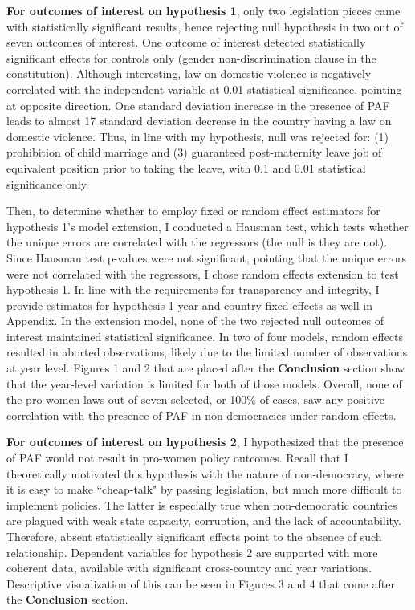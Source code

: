 \documentclass[12pt]{article}
\begin{document}
\textbf{For outcomes of interest on hypothesis 1}, only two legislation pieces came with statistically significant results, hence rejecting null hypothesis in two out of seven outcomes of interest. One outcome of interest detected statistically significant effects for controls only (gender non-discrimination clause in the constitution). Although interesting, law on domestic violence is negatively correlated with the independent variable at 0.01 statistical significance, pointing at opposite direction. One standard deviation increase in the presence of PAF leads to almost 17 standard deviation decrease in the country having a law on domestic violence. Thus, in line with my hypothesis, null was rejected for: (1) prohibition of child marriage and (3) guaranteed post-maternity leave job of equivalent position prior to taking the leave, with 0.1 and 0.01 statistical significance only. 

Then, to determine whether to employ fixed or random effect estimators for hypothesis 1's model extension, I conducted a Hausman test, which tests whether the unique errors are correlated with the regressors (the null is they are not). Since Hausman test p-values were not significant, pointing that the unique errors were not correlated with the regressors, I chose random effects extension to test hypothesis 1. In line with the requirements for transparency and integrity, I provide estimates for hypothesis 1 year and country fixed-effects as well in Appendix. In the extension model, none of the two rejected null outcomes of interest maintained statistical significance. In two of four models, random effects resulted in aborted observations, likely due to the limited number of observations at year level. Figures 1 and 2 that are placed after the \textbf{Conclusion} section show that the year-level variation is limited for both of those models. Overall, none of the pro-women laws out of seven selected, or 100\% of cases, saw any positive correlation with the presence of PAF in non-democracies under random effects. 

\textbf{For outcomes of interest on hypothesis 2}, I hypothesized that the presence of PAF would not result in pro-women policy outcomes. Recall that I theoretically motivated this hypothesis with the nature of non-democracy, where it is easy to make ``cheap-talk" by passing legislation, but much more difficult to implement policies. The latter is especially true when non-democratic countries are plagued with weak state capacity, corruption, and the lack of accountability. Therefore, absent statistically significant effects point to the absence of such relationship. Dependent variables for hypothesis 2 are supported with more coherent data, available with significant cross-country and year variations. Descriptive visualization of this can be seen in Figures 3 and 4 that come after the \textbf{Conclusion} section. 
\end{document}

